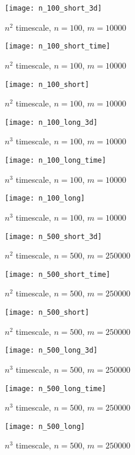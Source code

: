 \documentclass[11pt]{article}
\begin{document}
\clearpage
\begin{changemargin}{0.0cm}{0.0cm}
\centering
\begin{figure}[h!]
  \centering
  \texttt{[image: n\_100\_short\_3d]}
  \caption{$n^{2}$ timescale, $n=100$, $m=10000$}
  \label{fig:100s3}
\end{figure}
\centering
\begin{figure}[h!]
  \centering
  \texttt{[image: n\_100\_short\_time]}
  \caption{$n^{2}$ timescale, $n=100$, $m=10000$}
  \label{fig:100st}
\end{figure}
\centering
\begin{figure}[h!]
  \centering
  \texttt{[image: n\_100\_short]}
  \caption{$n^{2}$ timescale, $n=100$, $m=10000$}
  \label{fig:100sv}
\end{figure}

\begin{figure}[h!]
  \centering
  \texttt{[image: n\_100\_long\_3d]}
  \caption{$n^{3}$ timescale, $n=100$, $m=10000$}
  \label{fig:100l3}
\end{figure}
\begin{figure}[h!]
  \centering
  \texttt{[image: n\_100\_long\_time]}
  \caption{$n^{3}$ timescale, $n=100$, $m=10000$}
  \label{fig:100lt}
\end{figure}
\begin{figure}[h!]
  \centering
  \texttt{[image: n\_100\_long]}
  \caption{$n^{3}$ timescale, $n=100$, $m=10000$}
  \label{fig:100lv}
\end{figure}

\begin{figure}[h!]
  \centering
  \texttt{[image: n\_500\_short\_3d]}
  \caption{$n^{2}$ timescale, $n=500$, $m=250000$}
  \label{fig:500s3}
\end{figure}
\begin{figure}[h!]
  \centering
  \texttt{[image: n\_500\_short\_time]}
  \caption{$n^{2}$ timescale, $n=500$, $m=250000$}
  \label{fig:500st}
\end{figure}
\begin{figure}[h!]
  \centering
  \texttt{[image: n\_500\_short]}
  \caption{$n^{2}$ timescale, $n=500$, $m=250000$}
  \label{fig:500sv}
\end{figure}
\begin{figure}[h!]
  \centering
  \texttt{[image: n\_500\_long\_3d]}
  \caption{$n^{3}$ timescale, $n=500$, $m=250000$}
  \label{fig:500l3}
\end{figure}
\begin{figure}[h!]
  \centering
  \texttt{[image: n\_500\_long\_time]}
  \caption{$n^{3}$ timescale, $n=500$, $m=250000$}
  \label{fig:500lt}
\end{figure}
\begin{figure}[h!]
  \centering
  \texttt{[image: n\_500\_long]}
  \caption{$n^{3}$ timescale, $n=500$, $m=250000$}
  \label{fig:500lv}
\end{figure}


\end{changemargin}
\end{document}
